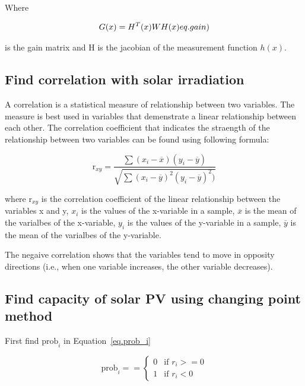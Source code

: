 Where

\begin{equation}
  G(x)=H^{T}(x)WH(x)
  \label(eq.gain)
\end{equation}

is the gain matrix and H is the jacobian of the measurement function $h(x)$.

\subsection{Find correlation with solar irradiation}

A correlation is a statistical measure of relationship between two variables. The measure is best used in variables that demenstrate a linear relationship between each other.
The correlation coefficient that indicates the straength of the relationship between two variables can be found using following formula:

\begin{equation}
  \text{r}_{xy} =\frac{\sum(x_{i}-\overline{x})(y_{i}-\overline{y})}{\sqrt{\sum(x_{i}-\overline{y})^{2}(y_{i}-\overline{y})^{2})}}
  \label{eq.corr}
\end{equation}

where $\text{r}_{xy}$ is the correlation coefficient of the linear relationship between the variables x and y, $x_{i}$ is the values of the x-variable in a sample, $\overline{x}$ is the mean of the varialbes of the x-variable,
$y_{i}$ is the values of the y-variable in a sample, $\overline{y}$ is the mean of the varialbes of the y-variable.

The negaive correlation shows that the variables tend to move in opposity directions (i.e., when one variable increases, the other variable decreases).

\subsection{Find capacity of solar PV using changing point method}

First find $\text{prob}_{i}$ in Equation~\ref{eq.prob_i}


\begin{equation}
  \text{prob}_{i}= =
  \begin{cases}
    0 & \text{if  $r_{i}>=0$} \\
    1 & \text{if  $r_{i}<0$}
  \end{cases}
  \label{eq.prob_i}
\end{equation}
